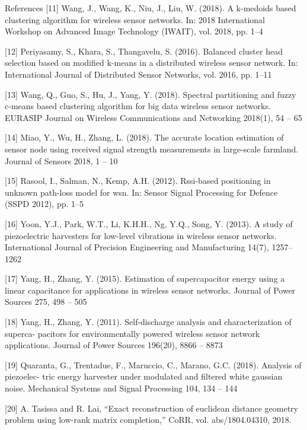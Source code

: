 \documentclass{beamer}
\begin{document}
\begin{frame}[t]{References}
\tiny
[11] Wang, J., Wang, K., Niu, J., Liu, W. (2018). A k-medoids based clustering algorithm for wireless sensor networks. In: 2018 International Workshop on Advanced Image Technology (IWAIT), vol. 2018, pp. 1–4

[12] Periyasamy, S., Khara, S., Thangavelu, S. (2016). Balanced cluster head selection based on modified k-means in a distributed wireless sensor network. In: International Journal of Distributed Sensor Networks, vol. 2016, pp. 1–11

[13] Wang, Q., Guo, S., Hu, J., Yang, Y. (2018). Spectral partitioning and fuzzy c-means based clustering algorithm for big data wireless sensor networks. EURASIP Journal on Wireless Communications and Networking 2018(1), 54 – 65

[14] Miao, Y., Wu, H., Zhang, L. (2018). The accurate location estimation of sensor node using received signal strength measurements in large-scale farmland. Journal of Sensors 2018, 1 – 10

[15] Rasool, I., Salman, N., Kemp, A.H. (2012). Rssi-based positioning in unknown path-loss model for wsn. In: Sensor Signal Processing for Defence (SSPD 2012), pp. 1–5

[16] Yoon, Y.J., Park, W.T., Li, K.H.H., Ng, Y.Q., Song, Y. (2013). A study of piezoelectric harvesters for low-level vibrations in wireless sensor networks. International Journal of Precision Engineering and Manufacturing 14(7), 1257–1262

[17] Yang, H., Zhang, Y. (2015). Estimation of supercapacitor energy using a linear capacitance for applications in wireless sensor networks. Journal of Power Sources 275, 498 – 505

[18] Yang, H., Zhang, Y. (2011). Self-discharge analysis and characterization of superca-
pacitors for environmentally powered wireless sensor network applications. Journal of
Power Sources 196(20), 8866 – 8873

[19] Quaranta, G., Trentadue, F., Maruccio, C., Marano, G.C. (2018). Analysis of piezoelec-
tric energy harvester under modulated and filtered white gaussian noise. Mechanical
Systems and Signal Processing 104, 134 – 144

[20] A. Tasissa and R. Lai, “Exact reconstruction of euclidean distance geometry problem using low-rank matrix completion,” CoRR, vol. abs/1804.04310, 2018.

\end{frame}
\end{document}
